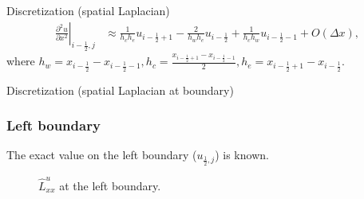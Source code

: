 \documentclass{beamer}
\begin{document}
	\begin{frame}{Discretization (spatial Laplacian)}
	\begin{align}\label{eqn:laplacian-discretization-non-uniform-dx}
	\left.\frac{\partial^2 u}{\partial x^2}\right|_{i-\frac{1}{2},j} & \approx \frac{1}{h_c h_e}u_{i-\frac{1}{2}+1} - \frac{2}{h_w h_e}u_{i-\frac{1}{2}} + \frac{1}{h_c h_w}u_{i-\frac{1}{2}-1} + O(\Delta x),
	\end{align}	
	where $h_w=x_{i-\frac{1}{2}}-x_{i-\frac{1}{2}-1},h_c = \frac{x_{i-\frac{1}{2}+1}-x_{i-\frac{1}{2}-1}}{2}, h_e = x_{i-\frac{1}{2}+1}-x_{i-\frac{1}{2}}$.
	\end{frame}


	\begin{frame}{Discretization (spatial Laplacian at boundary)}
	
	\subsubsection{Left boundary}\label{subsubsec:laplacian-left}
	The exact value on the left boundary ($u_{\frac{1}{2},j}$) is known.
	\begin{figure}[H] %
	  \caption{$\hat{L}^u_{xx}$ at the left boundary.}\label{fig:luxx-left}
	\end{figure}
	\end{frame}
	
\end{document}
